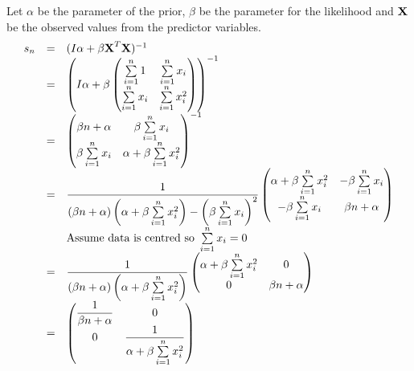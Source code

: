 \documentclass[11pt,a4paper]{article}
\begin{document}
Let $\alpha$ be the parameter of the prior, $\beta$ be the parameter for the likelihood and $\textbf{X}$ be the observed values from the predictor variables.
\[\begin{array}{rcl}
s_n&=&(I\alpha+\beta \textbf{X}^T\textbf{X})^{-1}\\
&=&\left(I\alpha+\beta\begin{pmatrix}
\sum\limits_{i=1}^n1&\sum\limits_{i=1}^nx_i\\
\sum\limits_{i=1}^nx_i&\sum\limits_{i=1}^nx_i^2
\end{pmatrix}\right)^{-1}\\
&=&\begin{pmatrix}
\beta n+\alpha&\beta\sum\limits_{i=1}^nx_i\\
\beta\sum\limits_{i=1}^nx_i&\alpha+\beta\sum\limits_{i=1}^nx_i^2
\end{pmatrix}^{-1}\\
&=&\dfrac{1}{(\beta n+\alpha)\left(\alpha+\beta\sum\limits_{i=1}^nx_i^2\right)-\left(\beta\sum\limits_{i=1}^nx_i\right)^2}\begin{pmatrix}
\alpha+\beta\sum\limits_{i=1}^nx_i^2&-\beta\sum\limits_{i=1}^nx_i\\
-\beta\sum\limits_{i=1}^nx_i&\beta n+\alpha
\end{pmatrix}\\
&&\text{Assume data is centred so }\sum\limits_{i=1}^nx_i=0\\
&=&\dfrac{1}{(\beta n+\alpha)\left(\alpha+\beta\sum\limits_{i=1}^nx_i^2\right)}\begin{pmatrix}
\alpha+\beta\sum\limits_{i=1}^nx_i^2&0\\
0&\beta n+\alpha
\end{pmatrix}\\
&=&\begin{pmatrix}
\dfrac{1}{\beta n+\alpha}&0\\
0&\dfrac{1}{\alpha+\beta\sum\limits_{i=1}^nx_i^2}
\end{pmatrix}
\end{array}\]
\end{document}
